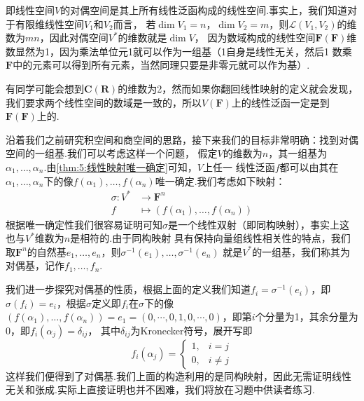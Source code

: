 即线性空间$V$的对偶空间是其上所有线性泛函构成的线性空间.事实上，我们知道对于有限维线性空间$V_1$和$V_2$而言，
若$\dim V_1=n$，$\dim V_2=m$，则$\mathcal{L}(V_1,V_2)$的维数为$mn$，因此对偶空间$V^*$的维数就是$\dim V$，
因为数域构成的线性空间$\mathbf{F}(\mathbf{F})$维数显然为1，因为乘法单位元1就可以作为一组基（1自身是线性无关，然后1
数乘$\mathbf{F}$中的元素可以得到所有元素，当然同理只要是非零元就可以作为基）.

有同学可能会想到$\mathbf{C}(\mathbf{R})$的维数为2，然而如果你翻回线性映射的定义就会发现，
我们要求两个线性空间的数域是一致的，所以$V(\mathbf{F})$上的线性泛函一定是到$\mathbf{F}(\mathbf{F})$上的.

沿着我们之前研究积空间和商空间的思路，接下来我们的目标非常明确：找到对偶空间的一组基.我们可以考虑这样一个问题，
假定$V$的维数为$n$，其一组基为$\alpha_1,\ldots,\alpha_n$.由\autoref{thm:5:线性映射唯一确定}可知，$V$上任一
线性泛函$f$都可以由其在$\alpha_1,\ldots,\alpha_n$下的像$f(\alpha_1),\ldots,f(\alpha_n)$唯一确定.我们考虑如下映射：
\begin{align*}
    \sigma:V^*&\to\mathbf{F}^n \\
    f&\mapsto(f(\alpha_1),\ldots,f(\alpha_n))
\end{align*}
根据唯一确定性我们很容易证明可知$\sigma$是一个线性双射（即同构映射），事实上这也与$V^*$维数为$n$是相符的.由于同构映射
具有保持向量组线性相关性的特点，我们取$\mathbf{F}^n$的自然基$e_1,\ldots,e_n$，则$\sigma^{-1}(e_1),\ldots,\sigma^{-1}(e_n)$
就是$V^*$的一组基，我们称其为对偶基，记作$f_1,\ldots,f_n$.

我们进一步探究对偶基的性质，根据上面的定义我们知道$f_i=\sigma^{-1}(e_i)$，即$\sigma(f_i)=e_i$，根据$\sigma$定义即$f_i$在$\sigma$下的像
$(f(\alpha_1),\ldots,f(\alpha_n))=e_1=(0,\cdots,0,1,0,\cdots,0)$，即第$i$个分量为1，其余分量为0，即$f_i(\alpha_j)=\delta_{ij}$，
其中$\delta_{ij}$为Kronecker符号，展开写即\[f_i(\alpha_j)=\begin{cases}
    1, & i=j \\
    0, & i\neq j
\end{cases}\]
这样我们便得到了对偶基.我们上面的构造利用的是同构映射，因此无需证明线性无关和张成.实际上直接证明也并不困难，我们将放在习题中供读者练习.

